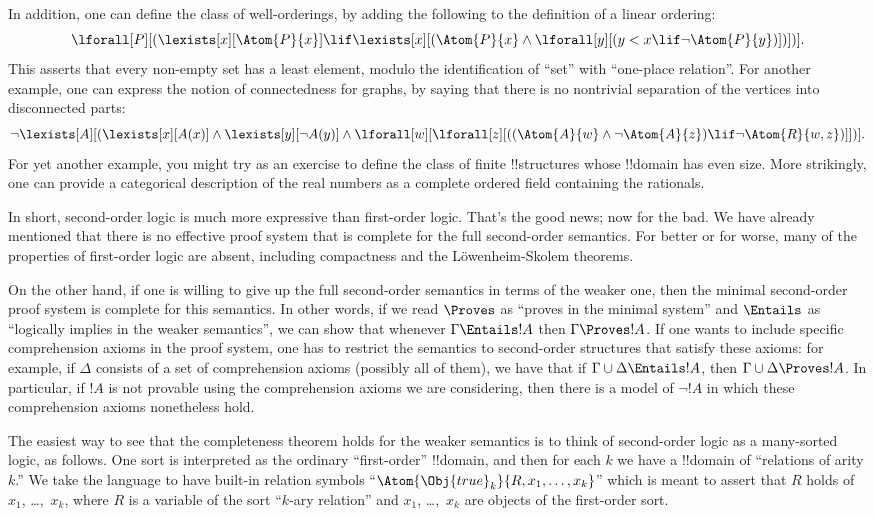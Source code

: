 \documentclass[../../../include/open-logic-section]{subfiles}
\begin{document}
In addition, one can define the class of well-orderings, by adding the
following to the definition of a linear ordering:
\[
\lforall[P][(\lexists[x][\Atom{P}{x}] \lif \lexists[x][(\Atom{P}{x}
    \land \lforall[y][(y < x \lif \lnot \Atom{P}{y})])])].
\]
This asserts that every non-empty set has a least element, modulo the
identification of ``set'' with ``one-place relation''. For another
example, one can express the notion of connectedness for graphs, by
saying that there is no nontrivial separation of the vertices into
disconnected parts:
\[
\lnot \lexists[A][(\lexists[x][A(x)] \land \lexists[y][\lnot A(y)]
  \land \lforall[w][\lforall[z][((\Atom{A}{w} \land \lnot \Atom{A}{z})
      \lif \lnot \Atom{R}{w,z})]])].
\]
For yet another example, you might try as an exercise to define the
class of finite !!{structure}s whose !!{domain} has even size. More
strikingly, one can provide a categorical description of the real
numbers as a complete ordered field containing the rationals.

In short, second-order logic is much more expressive than first-order
logic. That's the good news; now for the bad. We have already
mentioned that there is no effective proof system that is complete for
the full second-order semantics. For better or for worse, many of the
properties of first-order logic are absent, including compactness and
the L\"owenheim-Skolem theorems.

On the other hand, if one is willing to give up the full second-order
semantics in terms of the weaker one, then the minimal second-order
proof system is complete for this semantics. In other words, if we
read $\Proves$ as ``proves in the minimal system'' and $\Entails$ as
``logically implies in the weaker semantics'', we can show that
whenever $\Gamma \Entails !A$ then $\Gamma \Proves !A$. If one wants
to include specific comprehension axioms in the proof system, one has
to restrict the semantics to second-order structures that satisfy
these axioms: for example, if $\Delta$ consists of a set of
comprehension axioms (possibly all of them), we have that if $\Gamma
\cup \Delta \Entails !A$, then $\Gamma \cup \Delta \Proves !A$. In
particular, if $!A$ is not provable using the comprehension axioms we
are considering, then there is a model of $\lnot !A$ in which these
comprehension axioms nonetheless hold.

The easiest way to see that the completeness theorem holds for the
weaker semantics is to think of second-order logic as a many-sorted
logic, as follows. One sort is interpreted as the ordinary
``first-order'' !!{domain}, and then for each $k$ we have a !!{domain}
of ``relations of arity $k$.'' We take the language to have built-in
relation symbols ``$\Atom{\Obj{true}_k}{R,x_1,\dots,x_k}$'' which is
meant to assert that $R$ holds of $x_1$, \dots,~$x_k$, where $R$ is a
variable of the sort ``$k$-ary relation'' and $x_1$, \dots,~$x_k$ are
objects of the first-order sort.
\end{document}
